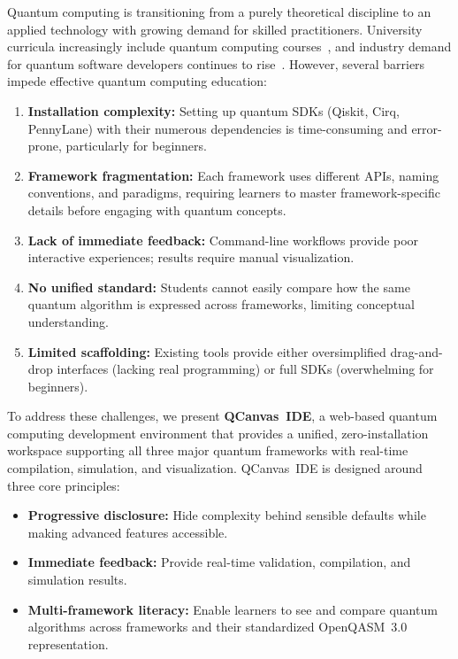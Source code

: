 \documentclass[conference]{IEEEtran}
\begin{document}
Quantum computing is transitioning from a purely theoretical discipline to an applied technology with growing demand for skilled practitioners. University curricula increasingly include quantum computing courses~\cite{asfaw2022building}, and industry demand for quantum software developers continues to rise~\cite{fox2020preparing}. However, several barriers impede effective quantum computing education:

\begin{enumerate}[label=(\alph*)]
    \item \textbf{Installation complexity:} Setting up quantum SDKs (Qiskit, Cirq, PennyLane) with their numerous dependencies is time-consuming and error-prone, particularly for beginners.
    \item \textbf{Framework fragmentation:} Each framework uses different APIs, naming conventions, and paradigms, requiring learners to master framework-specific details before engaging with quantum concepts.
    \item \textbf{Lack of immediate feedback:} Command-line workflows provide poor interactive experiences; results require manual visualization.
    \item \textbf{No unified standard:} Students cannot easily compare how the same quantum algorithm is expressed across frameworks, limiting conceptual understanding.
    \item \textbf{Limited scaffolding:} Existing tools provide either oversimplified drag-and-drop interfaces (lacking real programming) or full SDKs (overwhelming for beginners).
\end{enumerate}

To address these challenges, we present \textbf{QCanvas~IDE}, a web-based quantum computing development environment that provides a unified, zero-installation workspace supporting all three major quantum frameworks with real-time compilation, simulation, and visualization. QCanvas~IDE is designed around three core principles:

\begin{itemize}
    \item \textbf{Progressive disclosure:} Hide complexity behind sensible defaults while making advanced features accessible.
    \item \textbf{Immediate feedback:} Provide real-time validation, compilation, and simulation results.
    \item \textbf{Multi-framework literacy:} Enable learners to see and compare quantum algorithms across frameworks and their standardized OpenQASM~3.0 representation.
\end{itemize}
\end{document}
